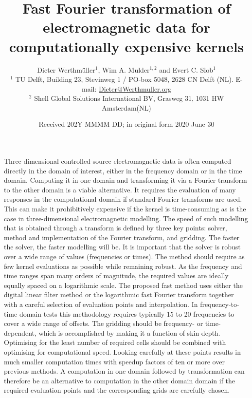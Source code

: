 \documentclass[extra, camera,%
]{gji}
\title[Transforming expensive EM kernels]{Fast Fourier transformation
of electromagnetic data for computationally expensive kernels}
\author[D. Werthmüller \emph{et al.}]
  {\Large
   Dieter Werthmüller$^1$,     %
   Wim A. Mulder$^{1,2}$ and   %
   Evert C. Slob$^1$           %
   \\
   {\footnotesize
    $^1$ TU Delft, Building 23, Stevinweg 1 / PO-box 5048, 2628 CN Delft (NL).
    E-mail: \href{mailto:Dieter@Werthmuller.org}{Dieter@Werthmuller.org}
   }\\[-.3em]
   {\footnotesize
    $^2$ Shell Global Solutions International BV, Grasweg 31, 1031 HW
    Amsterdam(NL)
   }
  }
\date{Received 202Y MMMM DD; in original form 2020 June 30}
\makeatletter
\let\zz@tabular\@tabular
\let\zzendtabular\endtabular
\let\zz@xtabularcr\@xtabularcr
\let\zz@tabclassz\@tabclassz
\let\zz@tabclassiv \@tabclassiv
\let\zz@tabarray\@tabarray
\makeatother
\begin{document}
\label{firstpage}

{\makeatletter
\let\@tabular\zz@tabular
\let\endtabular\zzendtabular
\let\@xtabularcr\zz@xtabularcr
\let\@tabclassz\zz@tabclassz
\let\@tabclassiv \zz@tabclassiv 
\let\@tabarray\zz@tabarray
\maketitle
}

\begin{summary}
%
Three-dimensional controlled-source electromagnetic data is often computed
directly in the domain of interest, either in the frequency domain or in the
time domain. Computing it in one domain and transforming it via a Fourier
transform to the other domain is a viable alternative. It requires the
evaluation of many responses in the computational domain if standard Fourier
transforms are used. This can make it prohibitively expensive if the kernel is
time-consuming as is the case in three-dimensional electromagnetic modelling.
The speed of such modelling that is obtained through a transform is defined by
three key points: solver, method and implementation of the Fourier transform,
and gridding.
%
The faster the solver, the faster modelling will be. It is important that the
solver is robust over a wide range of values (frequencies or times). The method
should require as few kernel evaluations as possible while remaining robust. As
the frequency and time ranges span many orders of magnitude, the required
values are ideally equally spaced on a logarithmic scale. The proposed fast
method uses either the digital linear filter method or the logarithmic fast
Fourier transform together with a careful selection of evaluation points and
interpolation. In frequency-to-time domain tests this methodology requires
typically 15 to 20 frequencies to cover a wide range of offsets.
%
The gridding should be frequency- or time-dependent, which is accomplished by
making it a function of skin depth. Optimising for the least number of required
cells should be combined with optimising for computational speed. Looking
carefully at these points results in much smaller computation times with
speedup factors of ten or more over previous methods. A computation in one
domain followed by transformation can therefore be an alternative to
computation in the other domain domain if the required evaluation points and
the corresponding grids are carefully chosen.
%
\end{summary}
\end{document}
